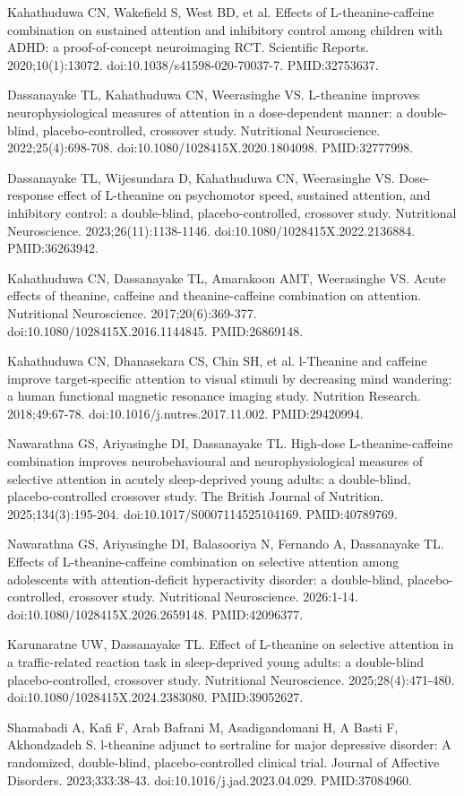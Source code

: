 \documentclass[11pt,oneside]{book}
\newcommand{\reff}[2]{\par\hangindent=7mm\hangafter=1\noindent[#1]\hspace{2mm}#2\par}
\begin{document}
\reff{42}{Kahathuduwa CN, Wakefield S, West BD, et al. Effects of L-theanine-caffeine combination on sustained attention and inhibitory control among children with ADHD: a proof-of-concept neuroimaging RCT. Scientific Reports. 2020;10(1):13072. doi:10.1038/s41598-020-70037-7. PMID:32753637.}
\reff{43}{Dassanayake TL, Kahathuduwa CN, Weerasinghe VS. L-theanine improves neurophysiological measures of attention in a dose-dependent manner: a double-blind, placebo-controlled, crossover study. Nutritional Neuroscience. 2022;25(4):698-708. doi:10.1080/1028415X.2020.1804098. PMID:32777998.}
\reff{44}{Dassanayake TL, Wijesundara D, Kahathuduwa CN, Weerasinghe VS. Dose-response effect of L-theanine on psychomotor speed, sustained attention, and inhibitory control: a double-blind, placebo-controlled, crossover study. Nutritional Neuroscience. 2023;26(11):1138-1146. doi:10.1080/1028415X.2022.2136884. PMID:36263942.}
\reff{45}{Kahathuduwa CN, Dassanayake TL, Amarakoon AMT, Weerasinghe VS. Acute effects of theanine, caffeine and theanine-caffeine combination on attention. Nutritional Neuroscience. 2017;20(6):369-377. doi:10.1080/1028415X.2016.1144845. PMID:26869148.}
\reff{46}{Kahathuduwa CN, Dhanasekara CS, Chin SH, et al. l-Theanine and caffeine improve target-specific attention to visual stimuli by decreasing mind wandering: a human functional magnetic resonance imaging study. Nutrition Research. 2018;49:67-78. doi:10.1016/j.nutres.2017.11.002. PMID:29420994.}
\reff{47}{Nawarathna GS, Ariyasinghe DI, Dassanayake TL. High-dose L-theanine-caffeine combination improves neurobehavioural and neurophysiological measures of selective attention in acutely sleep-deprived young adults: a double-blind, placebo-controlled crossover study. The British Journal of Nutrition. 2025;134(3):195-204. doi:10.1017/S0007114525104169. PMID:40789769.}
\reff{48}{Nawarathna GS, Ariyasinghe DI, Balasooriya N, Fernando A, Dassanayake TL. Effects of L-theanine-caffeine combination on selective attention among adolescents with attention-deficit hyperactivity disorder: a double-blind, placebo-controlled, crossover study. Nutritional Neuroscience. 2026:1-14. doi:10.1080/1028415X.2026.2659148. PMID:42096377.}
\reff{49}{Karunaratne UW, Dassanayake TL. Effect of L-theanine on selective attention in a traffic-related reaction task in sleep-deprived young adults: a double-blind placebo-controlled, crossover study. Nutritional Neuroscience. 2025;28(4):471-480. doi:10.1080/1028415X.2024.2383080. PMID:39052627.}
\reff{50}{Shamabadi A, Kafi F, Arab Bafrani M, Asadigandomani H, A Basti F, Akhondzadeh S. l-theanine adjunct to sertraline for major depressive disorder: A randomized, double-blind, placebo-controlled clinical trial. Journal of Affective Disorders. 2023;333:38-43. doi:10.1016/j.jad.2023.04.029. PMID:37084960.}
\end{document}
